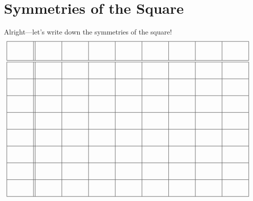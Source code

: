 \newpage
\section{Symmetries of the Square}

Alright---let's write down the symmetries of the square!
\[
{\renewcommand{\arraystretch}{2}
\begin{array}{|c||c|c|c|c|c|c|c|c|}
    \hline
 \rule[7mm]{10mm}{0mm} & \rule[7mm]{10mm}{0mm} & \rule[7mm]{10mm}{0mm} &\rule[7mm]{10mm}{0mm} & \rule[7mm]{10mm}{0mm} & \rule[7mm]{10mm}{0mm} & \rule[7mm]{10mm}{0mm} & \rule[7mm]{10mm}{0mm} & \rule[7mm]{10mm}{0mm}\\
    \hline\hline
        &       &       &       &       &       &      & & \\
    \hline
        &       &       &       &       &       &      & & \\
    \hline
        &       &       &       &       &       &      & & \\
    \hline
        &       &       &       &       &       &      & & \\
    \hline
        &       &       &       &       &       &      & & \\
    \hline
        &       &       &       &       &       &      & & \\
    \hline
        &       &       &       &       &       &      & & \\
    \hline
        &       &       &       &       &       &      & & \\
    \hline
\end{array}}
\]





